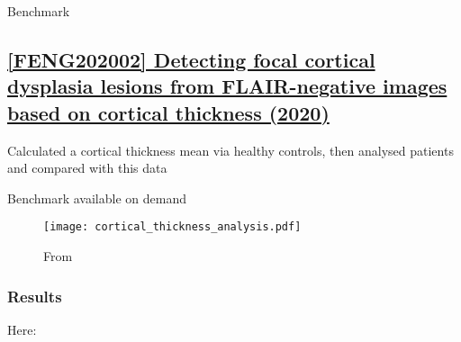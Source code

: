 \begin{table}[htbp]
	\centering
	\caption{Benchmark}

	\caption{Results from }
	\label{tab:res11}
\end{table}


\newpage
\subsection{\href{https://link.springer.com/article/10.1186/s12938-020-0757-8}{[FENG202002] Detecting focal cortical dysplasia lesions from FLAIR-negative images based on cortical thickness (2020) }}
\label{res12}

Calculated a cortical thickness mean via healthy controls, then analysed patients and compared with this data

Benchmark available on demand

\begin{figure}[htbp]
	\centering
	\texttt{[image: cortical\_thickness\_analysis.pdf]}
	\caption{From }%
	\label{fig:res12}
\end{figure}

\subsubsection{Results}

Here: 

